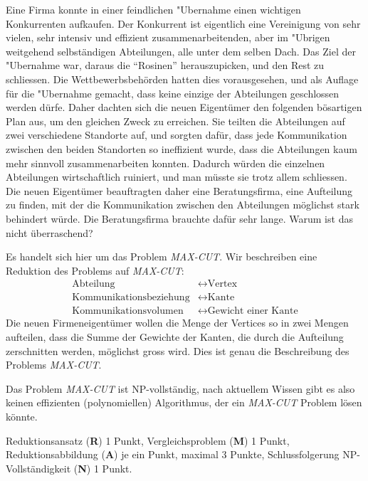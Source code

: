 Eine Firma konnte in einer feindlichen "Ubernahme einen wichtigen Konkurrenten
aufkaufen. Der Konkurrent ist eigentlich eine Vereinigung von sehr vielen,
sehr intensiv und effizient zusammenarbeitenden, aber im "Ubrigen weitgehend
selbständigen Abteilungen, alle unter dem selben Dach.
Das Ziel der "Ubernahme war, daraus die ``Rosinen'' herauszupicken, und
den Rest zu schliessen. Die Wettbewerbsbehörden hatten dies vorausgesehen,
und als Auflage für die "Ubernahme gemacht, dass keine einzige der Abteilungen
geschlossen werden dürfe.
Daher dachten sich die neuen Eigentümer den folgenden bösartigen Plan aus,
um den gleichen Zweck zu erreichen. Sie teilten die Abteilungen auf zwei 
verschiedene Standorte auf, und sorgten dafür, dass jede Kommunikation zwischen
den beiden Standorten so ineffizient wurde, dass die Abteilungen kaum mehr
sinnvoll zusammenarbeiten konnten.
Dadurch würden die einzelnen Abteilungen wirtschaftlich ruiniert, und man
müsste sie trotz allem schliessen.
Die neuen Eigentümer beauftragten daher eine Beratungsfirma, eine
Aufteilung zu finden, mit der die Kommunikation zwischen den Abteilungen
möglichst stark behindert würde.
Die Beratungsfirma brauchte dafür sehr lange. Warum ist das nicht
überraschend?


\begin{loesung}
Es handelt sich hier um das Problem \textsl{MAX-CUT}.
Wir beschreiben eine Reduktion des Problems auf \textsl{MAX-CUT}:
\begin{align*}
\text{Abteilung}&\leftrightarrow \text{Vertex} \\
\text{Kommunikationsbeziehung}&\leftrightarrow \text{Kante} \\
\text{Kommunikationsvolumen}&\leftrightarrow \text{Gewicht einer Kante}
\end{align*}
Die neuen Firmeneigentümer wollen die Menge der Vertices so in zwei
Mengen aufteilen, dass die Summe der Gewichte der Kanten, die durch die
Aufteilung zerschnitten werden, möglichst
gross wird. Dies ist genau die Beschreibung des Problems \textsl{MAX-CUT}.

Das Problem \textsl{MAX-CUT} ist NP-vollständig, nach aktuellem Wissen
gibt es also keinen effizienten (polynomiellen) Algorithmus, der ein
\textsl{MAX-CUT} Problem lösen könnte.
\end{loesung}

\begin{bewertung}
Reduktionsansatz ({\bf R}) 1 Punkt,
Vergleichsproblem ({\bf M}) 1 Punkt,
Reduktionsabbildung ({\bf A}) je ein Punkt, maximal 3 Punkte,
Schlussfolgerung NP-Vollständigkeit ({\bf N}) 1 Punkt.
\end{bewertung}

